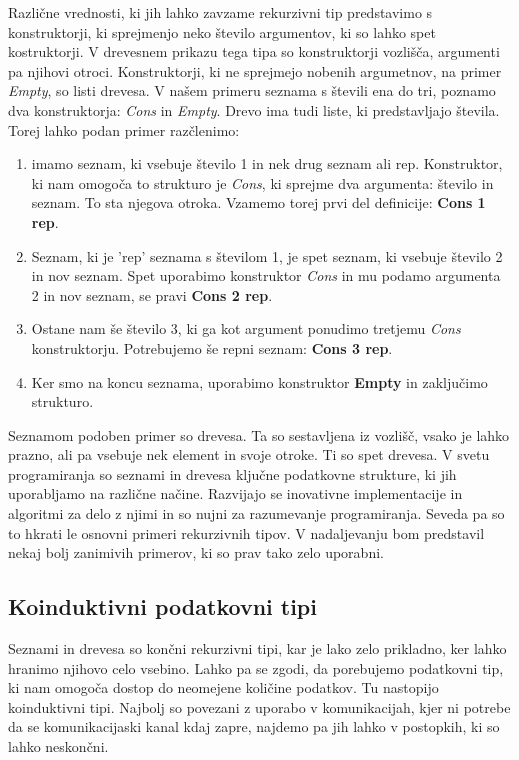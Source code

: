 \documentclass[a4paper]{report}
\begin{document}
Različne vrednosti, ki jih lahko zavzame rekurzivni tip predstavimo s konstruktorji, ki sprejmenjo neko število argumentov, ki so lahko spet kostruktorji. V drevesnem prikazu tega tipa so 
konstruktorji vozlišča, argumenti pa njihovi otroci. Konstruktorji, ki ne sprejmejo nobenih argumetnov, na primer \emph{Empty}, so listi drevesa. V našem primeru seznama s števili 
ena do tri, poznamo dva konstruktorja: \emph{Cons} in \emph{Empty}. Drevo ima tudi liste, ki predstavljajo števila. Torej lahko podan primer razčlenimo:
\begin{enumerate}
    \item imamo seznam, ki vsebuje število 1 in nek drug seznam ali rep. Konstruktor, ki nam omogoča to strukturo je \emph{Cons}, ki sprejme dva argumenta: število in seznam. To sta 
    njegova otroka. Vzamemo torej prvi del definicije: \textbf{Cons 1 rep}.
    \item Seznam, ki je 'rep' seznama s številom 1, je spet seznam, ki vsebuje število 2 in nov seznam. Spet uporabimo konstruktor \emph{Cons} in mu podamo argumenta 2 in nov seznam, se pravi 
    \textbf{Cons 2 rep}.
    \item Ostane nam še število 3, ki ga kot argument ponudimo tretjemu \emph{Cons} konstruktorju. Potrebujemo še repni seznam: \textbf{Cons 3 rep}.
    \item Ker smo na koncu seznama, uporabimo konstruktor \textbf{Empty} in zaključimo strukturo.
\end{enumerate}

Seznamom podoben primer so drevesa. Ta so sestavljena iz vozlišč, vsako je lahko prazno, ali pa vsebuje nek element in svoje otroke. Ti so spet drevesa. V svetu programiranja so seznami in drevesa 
ključne podatkovne strukture, ki jih uporabljamo na različne načine. Razvijajo se inovativne implementacije in algoritmi za delo z njimi in so nujni za razumevanje programiranja.
Seveda pa so to hkrati le osnovni primeri rekurzivnih tipov. V nadaljevanju bom predstavil nekaj bolj zanimivih primerov, ki so prav tako zelo uporabni.

\subsection{Koinduktivni podatkovni tipi}
Seznami in drevesa so končni rekurzivni tipi, kar je lako zelo prikladno, ker lahko hranimo njihovo celo vsebino. Lahko pa se zgodi, da porebujemo podatkovni tip, ki nam omogoča dostop do 
neomejene količine podatkov. Tu nastopijo koinduktivni tipi. Najbolj so povezani z uporabo v komunikacijah, kjer ni potrebe da se komunikacijaski kanal kdaj zapre, najdemo pa jih lahko v  
postopkih, ki so lahko neskončni. 
\end{document}

